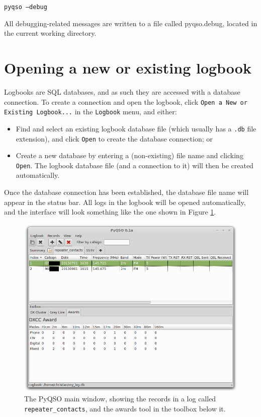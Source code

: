 \documentclass[11pt, a4paper]{report}
\begin{document}
  \texttt{pyqso --debug}

\noindent All debugging-related messages are written to a file called pyqso.debug, located in the current working directory.

\section{Opening a new or existing logbook}
Logbooks are SQL databases, and as such they are accessed with a database connection. To create a connection and open the logbook, click \texttt{Open a New or Existing Logbook...} in the \texttt{Logbook} menu, and either:
\begin{itemize}
  \item Find and select an existing logbook database file (which usually has a \texttt{.db} file extension), and click \texttt{Open} to create the database connection; or
  \item Create a new database by entering a (non-existing) file name and clicking \texttt{Open}. The logbook database file (and a connection to it) will then be created automatically.
\end{itemize}
Once the database connection has been established, the database file name will appear in the status bar. All logs in the logbook will be opened automatically, and the interface will look something like the one shown in Figure \ref{fig:log_view_with_awards}.

\begin{figure}
  \centering
  \includegraphics[width=1\columnwidth]{images/log_with_awards.png}
  \caption{The PyQSO main window, showing the records in a log called \texttt{repeater\_contacts}, and the awards tool in the toolbox below it.}
  \label{fig:log_view_with_awards}
\end{figure}
\end{document}
